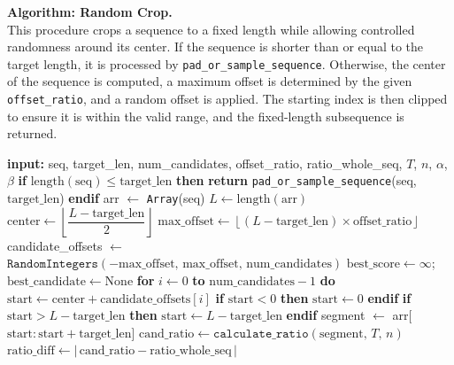 \documentclass{article}
\theoremstyle{remark}
\begin{document}
\noindent
\textbf{Algorithm: Random Crop.}\\
This procedure crops a sequence to a fixed length while allowing controlled randomness around its center. If the sequence is shorter than or equal to the target length, it is processed by \texttt{pad\_or\_sample\_sequence}. Otherwise, the center of the sequence is computed, a maximum offset is determined by the given \texttt{offset\_ratio}, and a random offset is applied. The starting index is then clipped to ensure it is within the valid range, and the fixed-length subsequence is returned.

\begin{algorithm}[H]
\caption{R-based Crop}
\begin{algorithmic}[1]
    \State \textbf{input:} seq, target\_len, num\_candidates, offset\_ratio, ratio\_whole\_seq, $T$, $n$, $\alpha$, $\beta$
    \State \textbf{if} $\mathrm{length}(\mathrm{seq}) \leq \mathrm{target\_len}$ \textbf{then}
        \State \quad \textbf{return} \texttt{pad\_or\_sample\_sequence}(seq, $\mathrm{target\_len}$)
    \State \textbf{endif}
    \State arr $\gets$ \texttt{Array}(seq) 
    \State $L \gets \mathrm{length}(\mathrm{arr})$
    \State $\mathrm{center} \gets \left\lfloor \dfrac{L - \mathrm{target\_len}}{2} \right\rfloor$
    \State $\mathrm{max\_offset} \gets \left\lfloor (L - \mathrm{target\_len})\times \mathrm{offset\_ratio} \right\rfloor$
    \State candidate\_offsets $\gets$ $\texttt{RandomIntegers}(-\mathrm{max\_offset},\, \mathrm{max\_offset},\, \mathrm{num\_candidates})$
    \State $\mathrm{best\_score} \gets \infty$; \quad $\mathrm{best\_candidate} \gets \mathrm{None}$
    \State \textbf{for} $i \gets 0$ \textbf{to} $\mathrm{num\_candidates}-1$ \textbf{do}
        \State \quad $\mathrm{start} \gets \mathrm{center} + \mathrm{candidate\_offsets}[i]$
        \State \quad \textbf{if} $\mathrm{start} < 0$ \textbf{then} $\mathrm{start} \gets 0$ \textbf{endif}
        \State \quad \textbf{if} $\mathrm{start} > L - \mathrm{target\_len}$ \textbf{then} $\mathrm{start} \gets L - \mathrm{target\_len}$ \textbf{endif}
        \State \quad segment $\gets$ arr[$\mathrm{start} : \mathrm{start} + \mathrm{target\_len}$]
        \State \quad $\mathrm{cand\_ratio} \gets \texttt{calculate\_ratio}(\mathrm{segment},\, T,\, n)$ 
        \State \quad $\mathrm{ratio\_diff} \gets \bigl|\,\mathrm{cand\_ratio} - \mathrm{ratio\_whole\_seq}\,\bigr|$

\end{algorithmic}
\end{algorithm}
\end{document}
